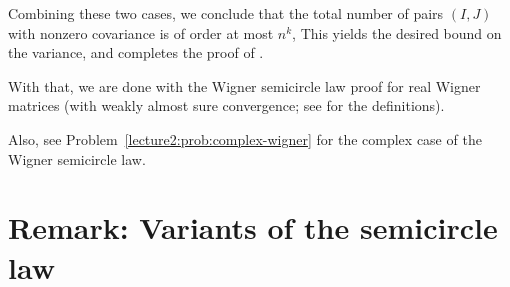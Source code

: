 \documentclass[letterpaper,11pt,oneside,reqno]{book}
\numberwithin{equation}{chapter}  %
\theoremstyle{definition}
\begin{document}
Combining these two cases, we conclude that the total number of pairs \((I,J)\) with nonzero covariance is of order at most \(n^k\),
This yields the desired bound on the variance, and completes the proof of .

With that, we are done with the Wigner semicircle law proof for real
Wigner matrices
(with weakly almost sure convergence;
see 
for the definitions).

Also, see Problem~\ref{lecture2:prob:complex-wigner} for the complex case of
the Wigner semicircle law.

\section{Remark: Variants of the semicircle law}
\end{document}
